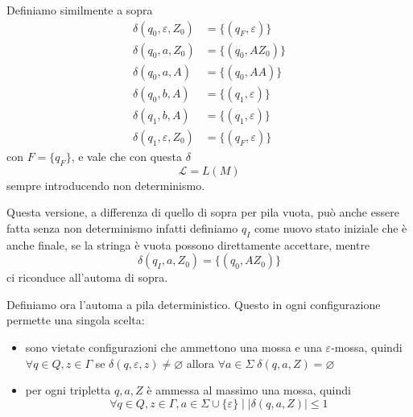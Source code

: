 \documentclass[12pt]{report}
\theoremstyle{definition}
\theoremstyle{regard}
\begin{document}
\begin{tcolorbox}
	Definiamo similmente a sopra
	\begin{align*}
		\delta(q_0, \varepsilon, Z_0) &= \{(q_F, \varepsilon)\} \\
		\delta(q_0, a, Z_0) &= \{(q_0, AZ_0)\} \\
		\delta(q_0, a, A)   &= \{(q_0, AA)\} \\
		\delta(q_0, b, A)   &= \{(q_1, \varepsilon)\} \\
		\delta(q_1, b, A)   &= \{(q_1, \varepsilon)\} \\
		\delta(q_1, \varepsilon, Z_0) &= \{(q_F, \varepsilon)\}
	\end{align*}
	con $F = \{q_F\}$, e vale che con questa $\delta$
	$$ \mathcal{L} = L(M) $$
	sempre introducendo non determinismo.
	
	Questa versione, a differenza di quello di sopra per pila vuota, può anche essere fatta senza non determinismo infatti definiamo $q_I$ come nuovo stato iniziale che è anche finale, se la stringa è vuota possono direttamente accettare, mentre 
	$$ \delta(q_I, a, Z_0) = \{(q_0, AZ_0)\} $$
	ci riconduce all'automa di sopra.
\end{tcolorbox}

Definiamo ora l'automa a pila deterministico.
Questo in ogni configurazione permette una singola scelta:
\begin{itemize}
	\item sono vietate configurazioni che ammettono una mossa e una $\varepsilon$-mossa, quindi $\forall q \in Q, z \in \Gamma$ se $\delta(q, \varepsilon, z) \neq \varnothing$ allora $\forall a \in \Sigma \; \delta(q, a, Z) = \varnothing$
	\item per ogni tripletta $q, a, Z$ è ammessa al massimo una mossa, quindi 
		$$\forall q \in Q, z \in \Gamma, a \in \Sigma \cup \{\varepsilon\} \mid |\delta(q, a, Z)|\leq 1$$
\end{itemize}
\end{document}
